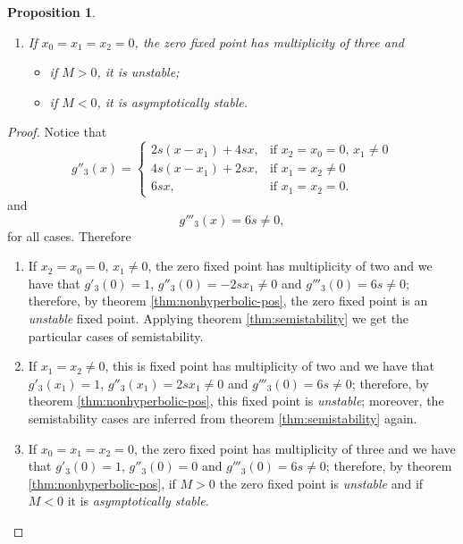 \documentclass[10pt,twoside,titlepage]{book}
\numberwithin{equation}{chapter}
\numberwithin{figure}{chapter}
\numberwithin{table}{chapter}
\theoremstyle{plain}%
\newtheorem{prop}[thm]{Proposition}
\theoremstyle{definition}
\theoremstyle{remark}
\begin{document}
\begin{prop}
\begin{enumerate}
\begin{itemize}
\begin{itemize}
			\end{itemize}
			\item or if $M<0$ and
			\begin{itemize}
				\item if $x_1>0$ it is semiasymptotically stable from the right;
				\item if $x_1<0$ it is semiasymptotically stable from the left.
			\end{itemize}
		\end{itemize}
		\item If $x_0=x_1=x_2=0$, the zero fixed point has multiplicity of three and
		\begin{itemize}
			\item if $M>0$, it is unstable;
			\item if $M<0$, it is asymptotically stable.
		\end{itemize}
	\end{enumerate}
\end{prop}
\begin{proof}
	Notice that
	\begin{equation}
		g''_3(x)=
		\begin{cases}
			2s(x-x_1)+4sx,	&\text{if } x_2=x_0=0,\,x_1\neq0\\
			4s(x-x_1)+2sx, 	&\text{if } x_1=x_2\neq0\\
			6sx,			&\text{if } x_1=x_2=0.
		\end{cases}
	\end{equation}
	and
	\begin{equation}
		g'''_3(x)=6s\neq0,
	\end{equation}
	for all cases.
	Therefore
	\begin{enumerate}
		\item If $x_2=x_0=0,\,x_1\neq0$, the zero fixed point has multiplicity of two and we have that $g'_3(0)=1$, $g''_3(0)=-2sx_1\neq0$ and $g'''_3(0)=6s\neq0$; therefore, by theorem \ref{thm:nonhyperbolic-pos}, the zero fixed point is an \emph{unstable} fixed point. Applying theorem \ref{thm:semistability} we get the particular cases of semistability.
		\item If $x_1=x_2\neq0$, this is fixed point has multiplicity of two and we have that $g'_3(x_1)=1$, $g''_3(x_1)=2sx_1\neq0$ and $g'''_3(0)=6s\neq0$; therefore, by theorem \ref{thm:nonhyperbolic-pos}, this fixed point is \emph{unstable}; moreover, the semistability cases are inferred from theorem \ref{thm:semistability} again.
		\item If $x_0=x_1=x_2=0$, the zero fixed point has multiplicity of three and we have that $g'_3(0)=1$, $g''_3(0)=0$ and $g'''_3(0)=6s\neq0$; therefore, by theorem \ref{thm:nonhyperbolic-pos}, if $M>0$ the zero fixed point is \emph{unstable} and if $M<0$ it is \emph{asymptotically stable}.
	\end{enumerate}
\end{proof}
\end{document}
